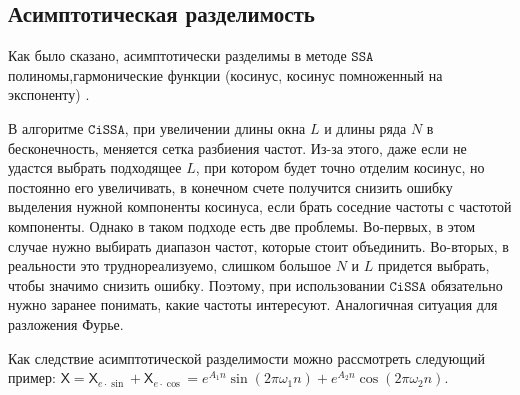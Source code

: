 \documentclass[12pt, specialist, subf
]{disser}
\theoremstyle{definition}
\newcommand{\SSA}{\texttt{SSA}}
\newcommand{\CISSA}{\texttt{CiSSA}}
\newcommand{\TS}{\mathsf{X}}
\begin{document}
\subsection{Асимптотическая разделимость}
\label{subsubsec:asymp}
Как было сказано, асимптотически разделимы в методе $\SSA$ полиномы,гармонические функции (косинус, косинус помноженный на экспоненту) \cite{golyandina2001analysis}.

В алгоритме $\CISSA$, при увеличении длины окна $L$ и длины ряда $N$ в бесконечность, меняется сетка разбиения частот. Из-за этого, даже если не удастся выбрать подходящее $L$, при котором будет точно отделим косинус, но постоянно его увеличивать, в конечном счете получится снизить ошибку выделения нужной компоненты косинуса, если брать соседние частоты с частотой компоненты. Однако в таком подходе есть две проблемы. Во-первых, в этом случае нужно выбирать диапазон частот, которые стоит объединить. Во-вторых, в реальности это труднореализуемо, слишком большое $N$ и $L$ придется выбрать, чтобы значимо снизить ошибку. Поэтому, при использовании $\CISSA$ обязательно нужно заранее понимать, какие частоты интересуют. Аналогичная ситуация для разложения Фурье.


Как следствие асимптотической разделимости можно рассмотреть следующий пример:
$\TS = \TS_{e\cdot\sin} + \TS_{e\cdot\cos} = e^{A_1 n } \sin(2\pi \omega_1 n ) + e^{A_2 n} \cos(2\pi \omega_2 n )$.
\end{document}
